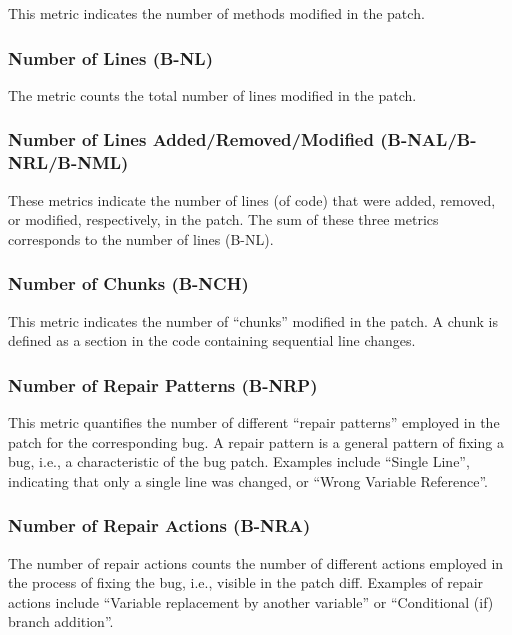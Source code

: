 This metric indicates the number of methods modified in the patch.

\subsubsection{Number of Lines (B-NL)}

The metric counts the total number of lines modified in the patch.

\subsubsection{Number of Lines Added/Removed/Modified (B-NAL/B-NRL/B-NML)}

These metrics indicate the number of lines (of code) that were added, removed,
or modified, respectively, in the patch. The sum of these three metrics
corresponds to the number of lines (B-NL).

\subsubsection{Number of Chunks (B-NCH)}

This metric indicates the number of \enquote{chunks} modified in the patch. A
chunk is defined as a section in the code containing sequential line changes.

\subsubsection{Number of Repair Patterns (B-NRP)}

This metric quantifies the number of different \enquote{repair patterns}
employed in the patch for the corresponding bug. A repair pattern is a general
pattern of fixing a bug, i.e., a characteristic of the bug patch. Examples
include  \enquote{Single Line}, indicating that only a single line was changed,
or \enquote{Wrong Variable Reference}.

\subsubsection{Number of Repair Actions (B-NRA)}

The number of repair actions counts the number of different actions employed in
the process of fixing the bug, i.e., visible in the patch diff. Examples of
repair actions include \enquote{Variable replacement by another variable} or
\enquote{Conditional (if) branch addition}.
